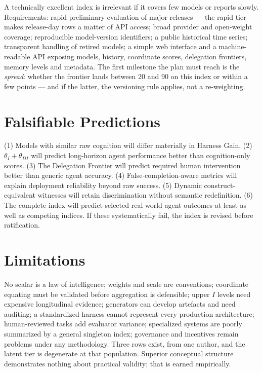 A technically excellent index is irrelevant if it covers few models or reports slowly. Requirements: rapid preliminary evaluation of major releases --- the rapid tier makes release-day rows a matter of API access; broad provider and open-weight coverage; reproducible model-version identifiers; a public historical time series; transparent handling of retired models; a simple web interface and a machine-readable API exposing models, history, coordinate scores, delegation frontiers, memory levels and metadata. The first milestone the plan must reach is the \emph{spread}: whether the frontier lands between 20 and 90 on this index or within a few points --- and if the latter, the versioning rule applies, not a re-weighting.

\section{Falsifiable Predictions}\label{sec:predictions}

(1) Models with similar raw cognition will differ materially in Harness Gain. (2) $\theta_I + \theta_{DI}$ will predict long-horizon agent performance better than cognition-only scores. (3) The Delegation Frontier will predict required human intervention better than generic agent accuracy. (4) False-completion-aware metrics will explain deployment reliability beyond raw success. (5) Dynamic construct-equivalent witnesses will retain discrimination without semantic redefinition. (6) The complete index will predict selected real-world agent outcomes at least as well as competing indices. If these systematically fail, the index is revised before ratification.

\section{Limitations}\label{sec:limits}

No scalar is a law of intelligence; weights and scale are conventions; coordinate equating must be validated before aggregation is defensible; upper $I$ levels need expensive longitudinal evidence; generators can develop artefacts and need auditing; a standardized harness cannot represent every production architecture; human-reviewed tasks add evaluator variance; specialized systems are poorly summarized by a general singleton index; governance and incentives remain problems under any methodology. Three rows exist, from one author, and the latent tier is degenerate at that population. Superior conceptual structure demonstrates nothing about practical validity; that is earned empirically.

